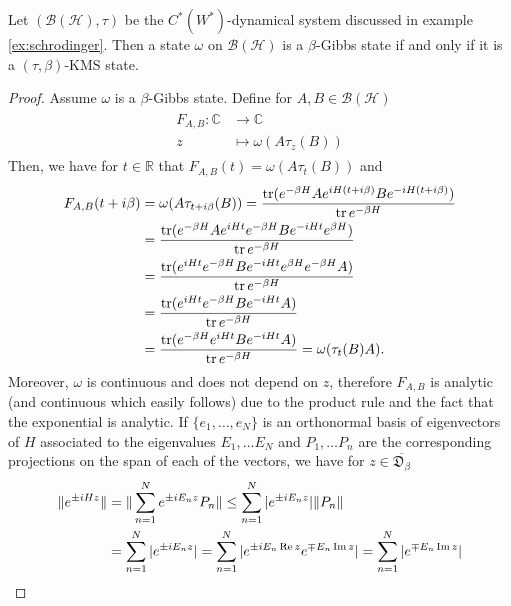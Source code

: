 \begin{theorem}\label{thm:gibbs}
Let $(\mathcal{B}(\mathcal{H}),\tau)$ be the $C^*(W^*)$-dynamical system discussed in example \ref{ex:schrodinger}. Then a state $\omega$ on $\mathcal{B}(\mathcal{H})$ is a $\beta$-Gibbs state if and only if it is a $(\tau,\beta)$-KMS state.  
\end{theorem}

\begin{proof}
Assume $\omega$ is a $\beta$-Gibbs state. Define for $A,B\in\mathcal{B}(\mathcal{H})$
\begin{align}
\begin{split}
F_{A,B}:\mathbb{C}&\rightarrow\mathbb{C} \\
z&\mapsto \omega(A\tau_z(B))
\end{split}
\end{align}
Then, we have for $t\in\mathbb{R}$ that $F_{A,B}(t)=\omega(A\tau_t(B))$ and 
\begin{align}
\begin{split}
F_{A,B}(t+i\beta)& =\omega(A\tau_{t+i\beta}(B))=\frac{\operatorname{tr}(e^{-\beta H}Ae^{iH(t+i\beta)}Be^{-iH(t+i\beta)})}{\operatorname{tr} e^{-\beta H}} \\
&= \frac{\operatorname{tr}(e^{-\beta H}Ae^{iHt}e^{-\beta H}Be^{-iHt}e^{\beta H})}{\operatorname{tr} e^{-\beta H}} \\
&= \frac{\operatorname{tr}(e^{iHt}e^{-\beta H}Be^{-iHt}e^{\beta H}e^{-\beta H}A)}{\operatorname{tr} e^{-\beta H}} \\
&= \frac{\operatorname{tr}(e^{iHt}e^{-\beta H}Be^{-iHt}A)}{\operatorname{tr} e^{-\beta H}} \\
&= \frac{\operatorname{tr}(e^{-\beta H}e^{iHt}Be^{-iHt}A)}{\operatorname{tr} e^{-\beta H}} = \omega(\tau_t(B)A).
\end{split} 
\end{align}
Moreover, $\omega$ is continuous and does not depend on $z$, therefore $F_{A,B}$ is analytic (and continuous which easily follows) due to the product rule and the fact that the exponential is analytic. 
If $\{e_1,\dots,e_N\}$ is an orthonormal basis of eigenvectors of $H$ associated to the eigenvalues $E_1,\dots E_N$ and $P_1,\dots P_n$ are the corresponding projections on the span of each of the vectors, we have for $z\in \overline{\mathfrak{D}_\beta}$
\begin{align}
\begin{split}
\|e^{\pm iHz}\|&=\|\sum_{n=1}^N e^{\pm iE_n z}P_n\|\leq\sum_{n=1}^N |e^{\pm iE_n z}|\|P_n\| \\
&=\sum_{n=1}^N |e^{\pm iE_n z}|=\sum_{n=1}^N |e^{\pm iE_n \re z}e^{\mp E_n \im z}|=\sum_{n=1}^N |e^{\mp E_n \im z}| \\

\end{split}
\end{align}
\end{proof}
